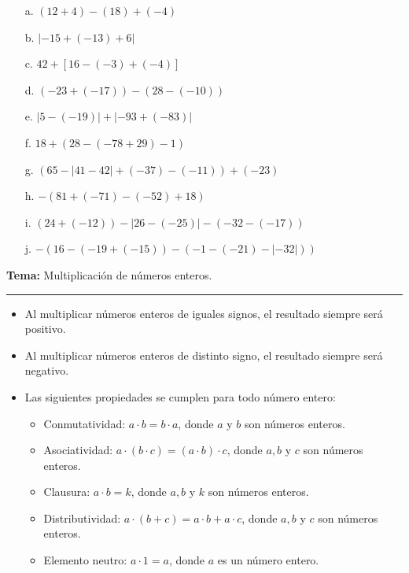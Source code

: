 \documentclass[spanish,letterpaper, 11pt, addpoints, answers]{exam}
\begin{document}
\begin{questions}
\begin{itemize}
  \item[a.] $(12+4)-(18)+(-4)$
  \vspace{3cm}
  \item[b.] $|-15+(-13)+6|$
  \vspace{3cm}
  \item[c.] $42+\left[16-(-3)+(-4)\right]$
  \vspace{3cm}
  \item[d.] $\left(-23+(-17)\right)-\left(28-(-10)\right)$
  \vspace{3cm}
  \item[e.] $\left|5-(-19)\right|+\left|-93+(-83)\right|$
  \vspace{3cm}
  \item[f.] $18+\left(28-\left(-78+29\right)-1\right)$
  \vspace{3cm}
  \item[g.] $\left(65-\left|41-42\right|+(-37)-(-11)\right)+(-23)$
  \vspace{3cm}
  \item[h.] $-\left(81+(-71)-(-52)+18\right)$
  \vspace{3cm}
  \item[i.] $\left(24+(-12)\right)-\left|26-(-25)\right|-\left(-32-(-17)\right)$
  \vspace{3cm}
  \item[j.] $-\left(16-\left(-19+(-15)\right)-\left(-1-(-21)-|-32|\right)\right)$       
\end{itemize}

\newpage
  \vspace{0.1in}
  \parbox{6in}{
  \textbf{Tema:} Multiplicación de números enteros.}
  \vspace{0.15in}
  \hrule 
  
  \begin{itemize}
    \item Al multiplicar números enteros de iguales signos, el resultado siempre será positivo.
  
    \item Al multiplicar números enteros de distinto signo, el resultado siempre será negativo.
    \item Las siguientes propiedades se cumplen para todo número entero:
    \begin{itemize}
      \item Conmutatividad: $a\cdot b=b\cdot a$, donde $a$ y $b$ son números enteros.
      \item Asociatividad: $a\cdot (b\cdot c)=(a\cdot b)\cdot c$, donde $a,b$ y $c$ son números enteros.
      \item Clausura: $a\cdot b=k$, donde $a,b$ y $k$ son números enteros.
      \item Distributividad: $a\cdot (b+c)=a\cdot b+a\cdot c$, donde $a,b$ y $c$ son números enteros.
      \item Elemento neutro: $a\cdot 1=a$, donde $a$ es un número entero. 
    \end{itemize}
    

\end{itemize}
\end{questions}
\end{document}
